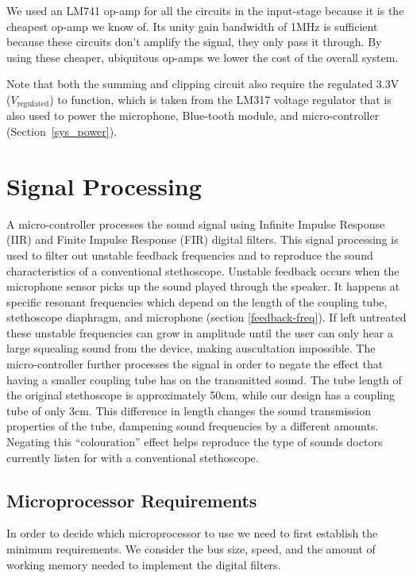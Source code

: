 We used an LM741 op-amp for all the circuits in the input-stage because it is the cheapest op-amp we know of. Its unity gain bandwidth of 1MHz is sufficient because these circuits don't amplify the signal, they only pass it through. By using these cheaper, ubiquitous op-amps we lower the cost of the overall system. 

Note that both the summing and clipping circuit also require the regulated 3.3V ($V_\text{regulated}$) to function, which is taken from the LM317 voltage regulator that is also used to power the microphone, Blue-tooth module, and micro-controller (Section~\ref{sys_power}).


\section{Signal Processing}
A micro-controller processes the sound signal using Infinite Impulse Response (IIR) and Finite Impulse Response (FIR) digital filters. This signal processing is used to filter out unstable feedback frequencies and to reproduce the sound characteristics of a conventional stethoscope. Unstable feedback occurs when the microphone sensor picks up the sound played through the speaker. It happens at specific resonant frequencies which depend on the length of the coupling tube, stethoscope diaphragm, and microphone (section \ref{feedback-freq}). If left untreated these unstable frequencies can grow in amplitude until the user can only hear a large squealing sound from the device, making auscultation impossible. The micro-controller further processes the signal in order to negate the effect that having a smaller coupling tube has on the transmitted sound. The tube length of the original stethoscope is approximately 50cm, while our design has a coupling tube of only 3cm. This difference in length changes the sound transmission properties of the tube, dampening sound frequencies by a different amounts. Negating this ``colouration'' effect helps reproduce the type of sounds doctors currently listen for with a conventional stethoscope.

\subsection{Microprocessor Requirements} \label{mcu-requirements}
In order to decide which microprocessor to use we need to first establish the minimum requirements. We consider the bus size, speed, and the amount of working memory needed to implement the digital filters.

